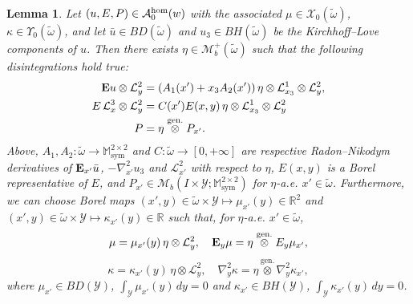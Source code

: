 \documentclass[reqno,10pt]{amsart}
\numberwithin{equation}{section}
\newtheorem{lemma}[theorem]{Lemma}
\theoremstyle{remark}
\newcommand{\calA}{\mathcal{A}}
\newcommand{\calL}{\mathcal{L}}
\newcommand{\M}{\mathbb{M}}
\newcommand{\R}{\mathbb{R}}
\newcommand{\calY}{\mathcal{Y}}
\DeclareMathOperator{\sym}{sym}
\newcommand{\Mb}{\mathcal{M}_b}
\newcommand{\genprod}{\stackrel{\text{gen.}}{\otimes}}
\newcommand{\calXzero}[1]{\mathcal{X}_0({#1})}
\newcommand{\calYzero}[1]{\Upsilon_0({#1})}
\newcommand{\ext}[1]{\widetilde{#1}}
\newcommand{\E}{{\bf E}}
\newcommand{\D}{\nabla}
\begin{document}
\begin{lemma} \label{disintegration result - regime zero}
Let $(u,E,P) \in \calA^{\rm hom}_{0}(w)$ with the associated $\mu \in \calXzero{\ext{\omega}}$, $\kappa \in \calYzero{\ext{\omega}}$, and let $\bar{u} \in BD(\ext{\omega})$ and $u_3 \in BH(\ext{\omega})$ be the Kirchhoff--Love components of $u$. 
Then there exists $\eta \in \Mb^+(\ext{\omega})$ such that the following disintegrations hold true:
\begin{align}
	\label{disintegration result 1 - regime zero} {\E}u \otimes \calL^{2}_{y} & = \left( A_1(x') + x_3 A_2(x') \right) \eta \otimes \calL^{1}_{x_3} \otimes \calL^{2}_{y},\\
	\label{disintegration result 2 - regime zero} E \,\calL^{3}_{x} \otimes \calL^{2}_{y} & = C(x') E(x,y) \,\eta \otimes \calL^{1}_{x_3} \otimes \calL^{2}_{y}\\
	\label{disintegration result 3 - regime zero} P & = \eta \genprod P_{x'}.
\end{align}
Above, $A_1, A_2 : \ext{\omega} \to \M^{2 \times 2}_{\sym}$ and $C : \ext{\omega} \to [0, +\infty]$ are respective Radon--Nikodym derivatives of ${\E}_{x'}\bar{u}$, $-{\D}^2_{x'}u_3$ and $\calL^{2}_{x'}$ with respect to $\eta$, $E(x,y)$ is a Borel representative of $E$, and $P_{x'} \in \Mb(I \times \calY;\M^{2 \times 2}_{\sym})$ for $\eta$-a.e. $x' \in \ext{\omega}$.
Furthermore, we can choose Borel maps $(x',y) \in \ext{\omega} \times \calY \mapsto \mu_{x'}(y) \in \R^2$ and $(x',y) \in \ext{\omega} \times \calY \mapsto \kappa_{x'}(y) \in \R$ such that, for $\eta$-a.e. $x' \in \ext{\omega}$,
\begin{equation} \label{disintegration result 4a - regime zero} 
	\mu = \mu_{x'}(y) \,\eta \otimes \calL^{2}_{y}, \quad {\E}_{y}\mu = \eta \genprod E_{y}\mu_{x'},
\end{equation}
\begin{equation} \label{disintegration result 4b - regime zero} 
	\kappa = \kappa_{x'}(y) \,\eta \otimes \calL^{2}_{y}, \quad {\D}^2_{y}\kappa = \eta \genprod {\D}^2_{y}\kappa_{x'},
\end{equation}
where $\mu_{x'} \in BD(\calY)$, $\int_{\calY} \mu_{x'}(y) \,dy = 0$ and $\kappa_{x'} \in BH(\calY)$, $\int_{\calY} \kappa_{x'}(y) \,dy = 0$.
\end{lemma}
\end{document}
